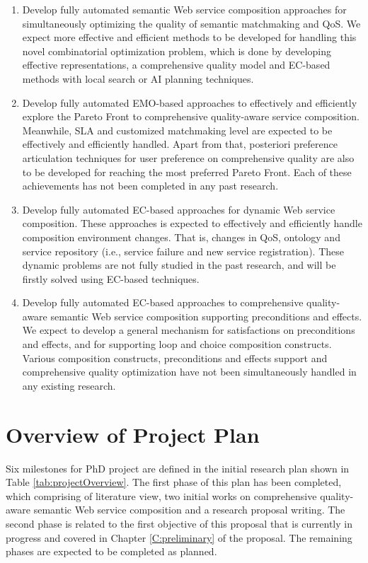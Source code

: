 \begin{enumerate}
 \item Develop fully automated semantic Web service composition approaches for simultaneously optimizing the quality of semantic matchmaking and QoS. We expect more effective and efficient methods to be developed for handling this novel combinatorial optimization problem, which is done by developing effective representations, a comprehensive quality model and EC-based methods with local search or AI planning techniques.

\item Develop fully automated EMO-based approaches to effectively and efficiently explore the Pareto Front to comprehensive quality-aware service composition. Meanwhile, SLA and customized matchmaking level are expected to be effectively and efficiently handled. Apart from that, posteriori preference articulation techniques for user preference on comprehensive quality are also to be developed for reaching the most preferred Pareto Front. Each of these achievements has not been completed in any past research.

\item Develop fully automated EC-based approaches for dynamic Web service composition. These approaches is expected to effectively and efficiently handle composition environment changes. That is, changes in QoS, ontology and service repository (i.e., service failure and new service registration). These dynamic problems are not fully studied in the past research, and will be firstly solved using EC-based techniques.

\item Develop fully automated EC-based approaches to comprehensive quality-aware semantic Web service composition supporting preconditions and effects. We expect to develop a general mechanism for satisfactions on preconditions and effects, and for supporting loop and choice composition constructs. Various composition constructs, preconditions and effects support and comprehensive quality optimization have not been simultaneously handled in any existing research.
\end{enumerate}

\section{Overview of Project Plan}

Six milestones for PhD project are defined in the initial research plan shown in Table \ref{tab:projectOverview}. The first phase of this plan has been completed, which comprising of literature view, two initial works on comprehensive quality-aware semantic Web service composition and a research proposal writing. The second phase is related to the first objective of this proposal that is currently in progress and covered in Chapter \ref{C:preliminary} of the proposal. The remaining phases are expected to be completed as planned.

